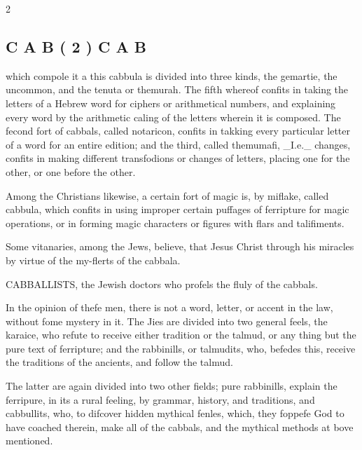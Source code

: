 \documentclass[10pt]{article}
\begin{document}
\begin{multicols}{2}\raggedcolumns
\subsection*{C A B ( 2 ) C A B}
which compole it a this cabbula is divided into three kinds, the gemartie, the uncommon, and the tenuta or themurah. The fifth whereof confits in taking the letters of a Hebrew word for ciphers or arithmetical numbers, and explaining every word by the arithmetic caling of the letters wherein it is composed. The fecond fort of cabbals, called notaricon, confits in takking every particular letter of a word for an entire edition; and the third, called themumafi, \_I.e.\_ changes, confits in making different transfodions or changes of letters, placing one for the other, or one before the other.

Among the Christians likewise, a certain fort of magic is, by miflake, called cabbula, which confits in using improper certain puffages of ferripture for magic operations, or in forming magic characters or figures with flars and talifiments.

Some vitanaries, among the Jews, believe, that Jesus Christ through his miracles by virtue of the my-flerts of the cabbala.

CABBALLISTS, the Jewish doctors who profels the fluly of the cabbals.

In the opinion of thefe men, there is not a word, letter, or accent in the law, without fome mystery in it. The Jies are divided into two general feels, the karaice, who refute to receive either tradition or the talmud, or any thing but the pure text of ferripture; and the rabbinills, or talmudits, who, befedes this, receive the traditions of the ancients, and follow the talmud.

The latter are again divided into two other fields; pure rabbinills, explain the ferripure, in its a rural feeling, by grammar, history, and traditions, and cabbullits, who, to difcover hidden mythical fenles, which, they foppefe God to have coached therein, make all of the cabbals, and the mythical methods at bove mentioned.


\end{multicols}
\end{document}
